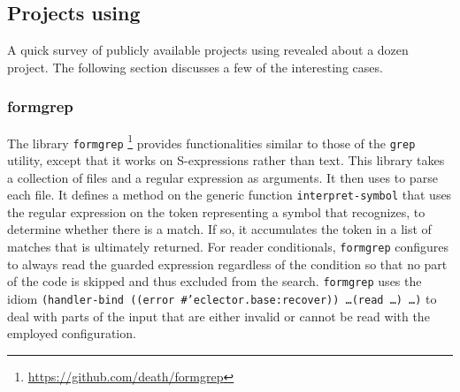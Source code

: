 \subsection{Projects using \eclector{}}

A quick survey of publicly available projects using \eclector{}
revealed about a dozen project.  The following section discusses a few
of the interesting cases.

\subsubsection{formgrep}

The library \texttt{formgrep}%
\footnote{\url{https://github.com/death/formgrep}}
provides functionalities similar to those of the \unix{} \texttt{grep}
utility, except that it works on S-expressions rather than text.  This
library takes a collection of files and a regular expression as
arguments.  It then uses \eclector{} to parse each file.  It defines a
method on the \eclector{} generic function \texttt{interpret-symbol}
that uses the regular expression on the token representing a symbol
that \eclector{} recognizes, to determine whether there is a match.  If
so, it accumulates the token in a list of matches that is ultimately
returned.  For reader conditionals, \texttt{formgrep} configures
\eclector{} to always read the guarded expression regardless of the
condition so that no part of the code is skipped and thus excluded
from the search.  \texttt{formgrep} uses the idiom
\texttt{(handler-bind ((error \#'eclector.base:recover)) \dots (read \dots) \dots)}
to deal with parts of the input that are either invalid or cannot be
read with the employed \eclector{} configuration.




